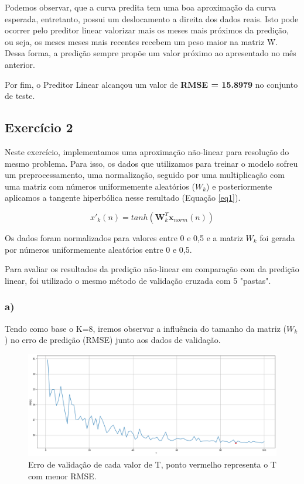 \documentclass[12pt]{article}
\begin{document}
Podemos observar, que a curva predita tem uma boa aproximação da curva esperada, entretanto, possui um deslocamento a direita dos dados reais. Isto pode ocorrer pelo preditor linear valorizar mais os meses mais próximos da predição, ou seja, os meses meses mais recentes recebem um peso maior na matriz W. Dessa forma, a predição sempre propõe um valor próximo ao apresentado no mês anterior. 

Por fim, o Preditor Linear alcançou um valor de \textbf{RMSE = 15.8979} no conjunto de teste.

\subsection*{Exercício 2}

Neste exercício, implementamos uma aproximação não-linear para resolução do mesmo problema. Para isso, os dados que utilizamos para treinar o modelo sofreu um preprocessamento, uma normalização, seguido por uma multiplicação com uma matriz com números uniformemente aleatórios ($W_k$) e posteriormente aplicamos a tangente hiperbólica nesse resultado (Equação \ref{eq1}). 

\begin{equation}
	x'_k(n) = tanh(\textbf{W}_k^T\textbf{x}_{norm}(n))
	\label{eq1}
\end{equation}

Os dados foram normalizados para valores entre 0 e 0,5 e a matriz $W_k$ foi gerada por números uniformemente aleatórios entre 0 e 0,5.

Para avaliar os resultados da predição não-linear em comparação com da predição linear, foi utilizado o mesmo método de validação cruzada com 5 "pastas".

\pagebreak
\subsubsection*{a)}

Tendo como base o K=8, iremos observar a influência do tamanho da matriz ($W_k$) no erro de predição (RMSE) junto aos dados de validação.

\begin{figure}[h!]
	\centering
	\includegraphics[width=\linewidth]{rmse_vs_T.png}
	\caption{Erro de validação de cada valor de T, ponto vermelho representa o T com menor RMSE.}
	\label{fig:rmse_vs_t}
\end{figure}
\end{document}
